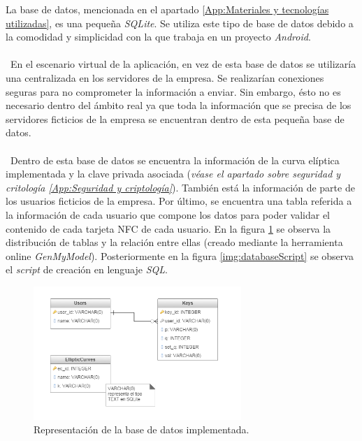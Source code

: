 \documentclass[../PFC.tex]{subfiles}
\begin{document}
La base de datos, mencionada en el apartado \ref{App:Materiales y tecnologías utilizadas}, es una pequeña \textit{SQLite}. Se utiliza este tipo de base de datos debido a la comodidad y simplicidad con la que trabaja en un proyecto \textit{Android}.
\\\\\
En el escenario virtual de la aplicación, en vez de esta base de datos se utilizaría una centralizada en los servidores de la empresa. Se realizarían conexiones seguras para no comprometer la información a enviar. Sin embargo, ésto no es necesario dentro del ámbito real ya que toda la información que se precisa de los servidores ficticios de la empresa se encuentran dentro de esta pequeña base de datos.
\\\\\
Dentro de esta base de datos se encuentra la información de la curva elíptica implementada y la clave privada asociada (\textit{véase el apartado sobre seguridad y critología \ref{App:Seguridad y criptología}}). También está la información de parte de los usuarios ficticios de la empresa. Por último, se encuentra una tabla referida a la información de cada usuario que compone los datos para poder validar el contenido de cada tarjeta NFC de cada usuario. En la figura \ref{img:database} se observa la distribución de tablas y la relación entre ellas (creado mediante la herramienta online \textit{GenMyModel}\cite{diagramaDBOnline}). Posteriormente en la figura \ref{img:databaseScript} se observa el \textit{script} de creación en lenguaje \textit{SQL}.

\begin{figure}[H]
  \centering
  \includegraphics[width=0.7\textwidth]{./img/database}
  \caption{Representación de la base de datos implementada.}
  \label{img:database}
\end{figure}
\end{document}
